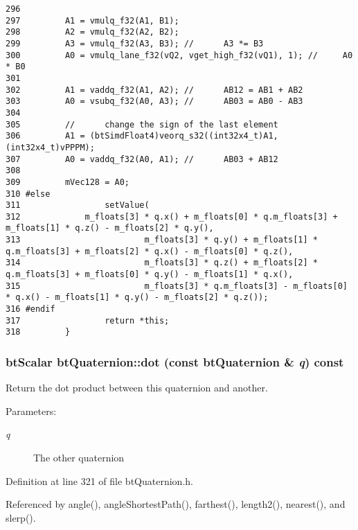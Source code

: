\begin{Code}
\begin{verbatim}
296 
297         A1 = vmulq_f32(A1, B1);
298         A2 = vmulq_f32(A2, B2);
299         A3 = vmulq_f32(A3, B3); //      A3 *= B3
300         A0 = vmulq_lane_f32(vQ2, vget_high_f32(vQ1), 1); //     A0 * B0
301 
302         A1 = vaddq_f32(A1, A2); //      AB12 = AB1 + AB2
303         A0 = vsubq_f32(A0, A3); //      AB03 = AB0 - AB3 
304         
305         //      change the sign of the last element
306         A1 = (btSimdFloat4)veorq_s32((int32x4_t)A1, (int32x4_t)vPPPM);  
307         A0 = vaddq_f32(A0, A1); //      AB03 + AB12
308         
309         mVec128 = A0;
310 #else
311                 setValue(
312             m_floats[3] * q.x() + m_floats[0] * q.m_floats[3] + m_floats[1] * q.z() - m_floats[2] * q.y(),
313                         m_floats[3] * q.y() + m_floats[1] * q.m_floats[3] + m_floats[2] * q.x() - m_floats[0] * q.z(),
314                         m_floats[3] * q.z() + m_floats[2] * q.m_floats[3] + m_floats[0] * q.y() - m_floats[1] * q.x(),
315                         m_floats[3] * q.m_floats[3] - m_floats[0] * q.x() - m_floats[1] * q.y() - m_floats[2] * q.z());
316 #endif
317                 return *this;
318         }
\end{verbatim}
\end{Code}


\hypertarget{classbt_quaternion_37e450f3206a7b6f3f55049e297fb403}{
\subsubsection[dot]{\setlength{\rightskip}{0pt plus 5cm}btScalar btQuaternion::dot (const {\bf btQuaternion} \& {\em q}) const}}
\label{classbt_quaternion_37e450f3206a7b6f3f55049e297fb403}


Return the dot product between this quaternion and another. 

\begin{Desc}
\item[Parameters:]
\begin{description}
\item[{\em q}]The other quaternion \end{description}
\end{Desc}


Definition at line 321 of file btQuaternion.h.

Referenced by angle(), angleShortestPath(), farthest(), length2(), nearest(), and slerp().

